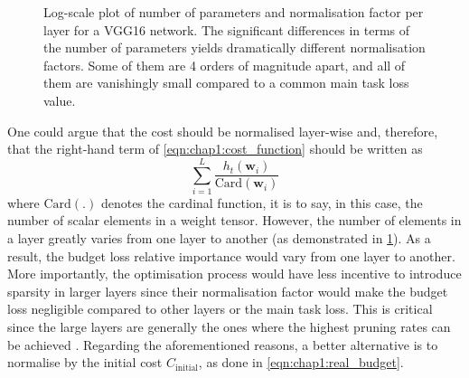 \begin{figure}
  \centering
    \caption{ Log-scale plot of
      number of parameters and normalisation factor per layer for a VGG16
      network. The significant differences in terms of the number of parameters
      yields dramatically different normalisation factors. Some of them are 4
      orders of magnitude apart, and all of them are vanishingly small compared
      to a common main task loss value.} 
  \label{fig:chap1:vgg16_per_layer_param_and_norm_factor}
\end{figure}

One could argue that the cost should be normalised layer-wise and, therefore,
that the right-hand term of \cref{eqn:chap1:cost_function} should be written as
$$\displaystyle\sum_{i=1}^{L}\frac{h_t(\mathbf{w}_i)}{\text{Card}(\mathbf{w}_i)}$$
where $\text{Card}(.)$ denotes the cardinal function, it is to say, in this
case, the number of scalar elements in a weight tensor. However, the number of
elements in a layer greatly varies from one layer to another (as demonstrated in
\cref{fig:chap1:vgg16_per_layer_param_and_norm_factor}). As a result,  the
budget loss relative importance would vary from one layer to another. More
importantly, the optimisation process would have less incentive to introduce
sparsity in larger layers since their normalisation factor would make the budget
loss negligible compared to other layers or the main task loss. This is critical
since the large layers are generally the ones where the highest pruning rates
can be achieved \cite{DBLP:journals/corr/abs-2202-12002}. Regarding the
aforementioned reasons, a better alternative is to normalise by the initial cost
$C_\text{initial}$, as done in \cref{eqn:chap1:real_budget}.\\

